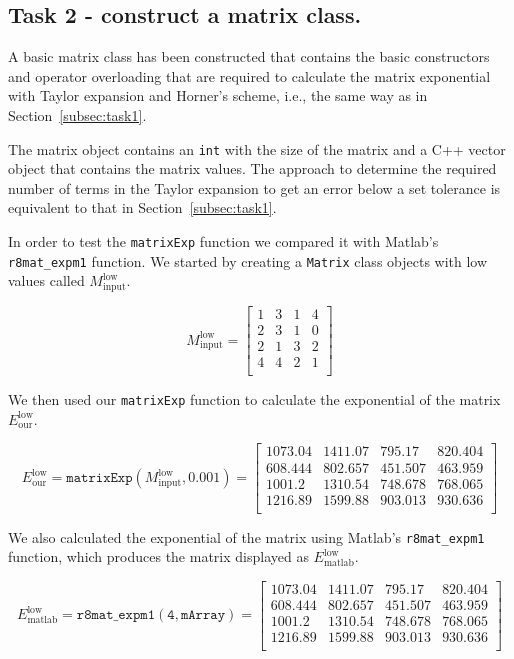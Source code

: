 \documentclass[paper=a4, fontsize=11pt]{article} %
\begin{document}
\subsection{Task 2 - construct a matrix class.}

A basic matrix class has been constructed that contains the basic
constructors and operator overloading that are required to calculate
the matrix exponential with Taylor expansion and Horner's scheme,
i.e., the same way as in Section~\ref{subsec:task1}.

The matrix object contains an \texttt{int} with the size of the matrix
and a C++ vector object that contains the matrix values. The approach
to determine the required number of terms in the Taylor expansion to
get an error below a set tolerance is equivalent to that in
Section~\ref{subsec:task1}.

In order to test the \texttt{matrixExp} function we compared it with
Matlab's \texttt{r8mat\_{expm1}} function. We started by creating a
\texttt{Matrix} class objects with low values called $M_{\text{input}}^{\text{low}}$.

\[
  M_{\text{input}}^{\text{low}}=
  \begin{bmatrix}
    1 & 3 & 1 & 4 \\
    2 & 3 & 1 & 0 \\
    2 & 1 & 3 & 2 \\
    4 & 4 & 2 & 1 \\
  \end{bmatrix}
\]

We then used our \texttt{matrixExp} function to calculate the
exponential of the matrix $E_{\text{our}}^{\text{low}}$.

\[
  E_{\text{our}}^{\text{low}} = \mathtt{matrixExp}(M_{\text{input}}^{\text{low}},0.001) =
  \begin{bmatrix}
    1073.04 & 1411.07 & 795.17  & 820.404 \\
    608.444 & 802.657 & 451.507 & 463.959 \\
    1001.2  & 1310.54 & 748.678 & 768.065 \\
    1216.89 & 1599.88 & 903.013 & 930.636 \\
  \end{bmatrix}
\]

We also calculated the exponential of the matrix using Matlab's
\texttt{r8mat\_{expm1}} function, which produces the matrix displayed
as $E_{\text{matlab}}^{\text{low}}$.

\[
  E_{\text{matlab}}^{\text{low}} = \mathtt{r8mat\_{expm1}(4, mArray)} =
  \begin{bmatrix}
    1073.04 & 1411.07 & 795.17  & 820.404 \\
    608.444 & 802.657 & 451.507 & 463.959 \\
    1001.2  & 1310.54 & 748.678 & 768.065 \\
    1216.89 & 1599.88 & 903.013 & 930.636 \\
  \end{bmatrix}
\]
\end{document}
